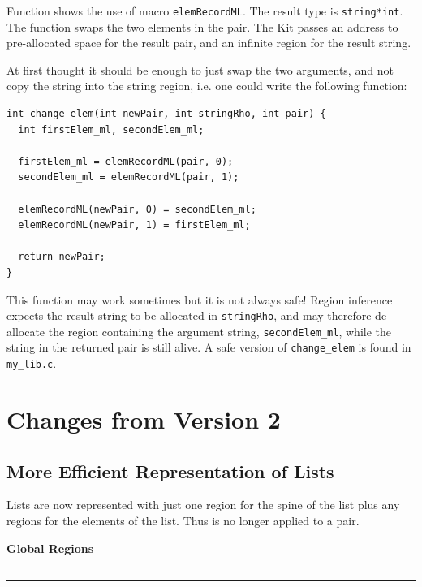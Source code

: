 \documentclass[12pt]{book}
\begin{document}
\begin{example}\label{change_elem.ex}
  Function  shows the use of
  macro \texttt{elemRecordML}. The result type is \texttt{string*int}. The
  function swaps the two elements in the pair. The Kit passes an address to
  pre-allocated space for the result pair, and an infinite region for the
  result string.
  
  At first thought it should be enough to just swap the two arguments, and
  not copy the string into the string region, i.e. one could write the
  following function:

\begin{verbatim}
int change_elem(int newPair, int stringRho, int pair) {
  int firstElem_ml, secondElem_ml;

  firstElem_ml = elemRecordML(pair, 0);
  secondElem_ml = elemRecordML(pair, 1);

  elemRecordML(newPair, 0) = secondElem_ml;
  elemRecordML(newPair, 1) = firstElem_ml;

  return newPair;
}
\end{verbatim}

This function may work sometimes but it is not always safe! Region
inference expects the result string to be allocated in
\texttt{stringRho}, and may therefore de-allocate the region containing
the argument string, \texttt{secondElem\_ml}, while the string in the
returned pair is still alive. A safe version of \texttt{change\_elem} is
found in \texttt{my\_lib.c}.
\end{example}

\chapter{Changes from Version 2}
\section{More Efficient Representation of Lists}
Lists are now represented with just one region for the spine of the list
plus any regions for the elements of the list. Thus \boxml{::} is no
longer applied to a pair.

\printindex
\begin{center}
\bf Global Regions
\end{center}
\smallskip

\hrule
{}
\hrule
\bigskip
\end{document}
